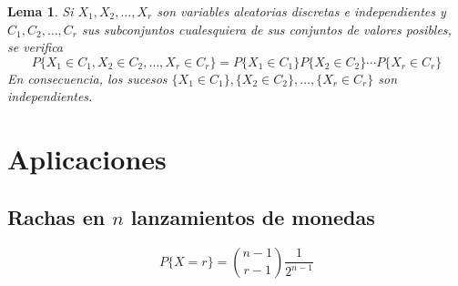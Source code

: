 \documentclass[12pt,a4paper,twoside]{memoir}
\theoremstyle{mystyle}
\newtheorem{lemma}[definition]{Lema}
\begin{document}
\begin{lemma}
  Si $X_1,X_2,\ldots,X_r$ son variables aleatorias discretas e independientes y $C_1,C_2,\ldots,C_r$ sus subconjuntos cualesquiera de sus conjuntos de valores posibles, se verifica
  \[
  P\{X_1 \in C_1, X_2 \in C_2,\ldots,X_r \in C_r\} = P\{X_1 \in C_1\}P\{X_2 \in C_2\} \cdots P\{X_r \in C_r\}
  \]
  En consecuencia, los sucesos $\{X_1 \in C_1\}, \{X_2 \in C_2\},\ldots,\{X_r \in C_r\}$ son independientes.
\end{lemma}

\section{Aplicaciones}

\subsection{Rachas en $n$ lanzamientos de monedas}

\[
P\{X=r\} = \binom{n-1}{r-1}\frac{1}{2^{n-1}}
\]








\end{document}
